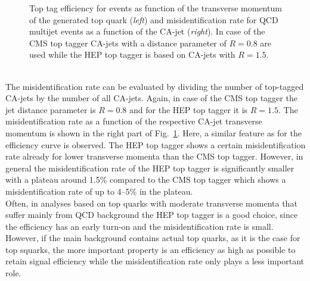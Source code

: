 \begin{description}
\begin{figure}[!t]
{\begin{tabular}{cc}
  \end{tabular}}
  \caption{Top tag efficiency for \ttbar events as function of the transverse momentum of the generated top quark (\textit{left}) and misidentification rate for QCD multijet events as a function of the CA-jet \pt (\textit{right}). In case of the CMS top tagger CA-jets with a distance parameter of $R=0.8$ are used while the HEP top tagger is based on CA-jets with $R=1.5$.}
  \label{fig:stop_top_eff}
\end{figure} 
\\
The misidentification rate can be evaluated by dividing the number of top-tagged CA-jets by the number of all CA-jets. Again, in case of the CMS top tagger the jet distance parameter is $R=0.8$ and for the HEP top tagger it is $R=1.5$. The misidentification rate as a function of the respective CA-jet transverse momentum is shown in the right part of Fig.~\ref{fig:stop_top_eff}. Here, a similar feature as for the efficiency curve is observed. The HEP top tagger shows a certain misidentification rate already for lower transverse momenta than the CMS top tagger. However, in general the misidentification rate of the HEP top tagger is significantly smaller with a plateau around 1.5\% compared to the CMS top tagger which shows a misidentification rate of up to 4--5\% in the plateau. \\
Often, in analyses based on top quarks with moderate transverse momenta that suffer mainly from QCD background the HEP top tagger is a good choice, since the efficiency has an early turn-on and the misidentification rate is small. However, if the main background contains actual top quarks, as it is the case for top squarks, the more important property is an efficiency as high as possible to retain signal efficiency while the misidentification rate only plays a less important role. 
\end{description}
